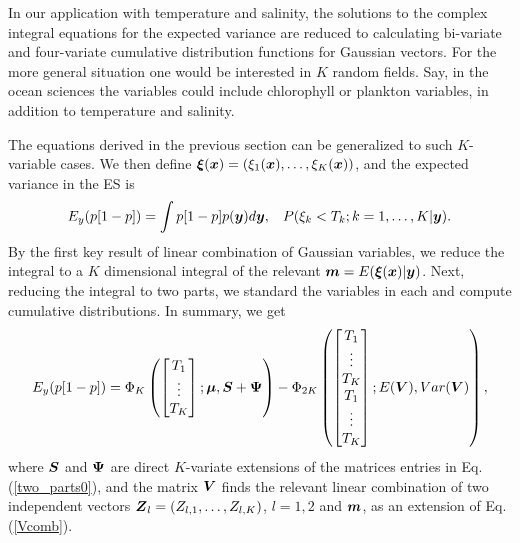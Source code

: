 \documentclass[aoas]{imsart}
\begin{document}
In our application with temperature and salinity, the solutions to the complex integral equations for the expected variance are reduced to calculating bi-variate and four-variate cumulative distribution functions for Gaussian vectors. For the more general situation one would be interested in $K$ random fields. Say, in the ocean sciences the variables could include chlorophyll or plankton variables, in addition to temperature and salinity. 

The equations derived in the previous section can be generalized to such $K$-variable cases. We then define ${\boldsymbol \xi}({\boldsymbol x})=(\xi_1({\boldsymbol x}),\ldots,\xi_K({\boldsymbol x}))$, and the expected variance in the ES is
\begin{equation}\label{two_partsK}
E_y(p[1-p]) = \int p[1-p] p(\by) d\by, \hspace{3mm} P(\xi_k < T_k ; k=1,\ldots,K|\by). 
\end{equation}
By the first key result of linear combination of Gaussian variables, we reduce the integral to a $K$ dimensional integral of the relevant ${\boldsymbol m}=E({\boldsymbol \xi}({\boldsymbol x})|{\boldsymbol y})$. Next, reducing the integral to two parts, we standard the variables in each and compute cumulative distributions. 
In summary, we get 
\begin{equation}\label{two_parts}
E_y(p[1-p]) =  \Phi_K 
\begin{pmatrix}
\begin{bmatrix} T_1\\
\vdots \\
T_K 
\end{bmatrix};
\bmu,\bS+\bPsi 
\end{pmatrix}
- \Phi_{2K} 
\begin{pmatrix}
\begin{bmatrix} T_1\\
\vdots \\
T_K \\
T_1\\
\vdots \\
T_K 
\end{bmatrix};
E(\bV),Var(\bV) 
\end{pmatrix},\nonumber
\end{equation}
where ${\boldsymbol S}$ and ${\boldsymbol \Psi}$ are direct $K$-variate extensions of the matrices entries in Eq. (\ref{two_parts0}), and the matrix ${\boldsymbol V}$ finds the relevant linear combination of two independent vectors ${\boldsymbol Z}_l=(Z_{l,1},\ldots,Z_{l,K})$, $l=1,2$ and ${\boldsymbol m}$, as an extension of Eq. (\ref{Vcomb}).

\end{document}
